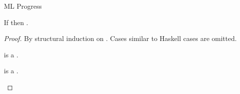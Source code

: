 \begin{theorem}{ML Progress}

\label{thmpsm}

If \judem{}{\varexpm}{\vartym} then \pshyp{\first{\varexpm}}{\second{\varexpm}}.

\begin{proof}

By structural induction on \varexpm.  Cases similar to Haskell cases are omitted.


\newcommand{\psconswm}{\expcons{\first{\varvalum}}{\second{\varvalum}}\xspace}

\begin{case}{\psconswm}

\psconswm is a \profv.

\end{case}


\newcommand{\psfappm}{\expfapp{\first{\varexpm}}{\second{\varexpm}}}
\renewcommand{\x}{\expfabss{\varvarm}{\first{\vartym}}{\third{\varexpm}}}

\begin{case}{\psfappm}

\pshypby
{\first{\varexpm}}
{\third{\varexpm}}
\psvalifeqm
{\first{\varexpm}}
{\tyfun{\first{\vartym}}{\second{\vartym}}}
{\x}
\pssub
{\first{\varexpm}}
{\third{\varexpm}}
{\psfappm}
{\expfapp{\third{\varexpm}}{\second{\varexpm}}}
\pserr
{\first{\varexpm}}
{\psfappm}
\pshypby
{\second{\varexpm}}
{\third{\varexpm}}
\pssuband
{\second{\varexpm}}
{\third{\varexpm}}
{\first{\varexpm}}
{\psfappm}
{\expfapp{\first{\varexpm}}{\third{\varexpm}}}
\pserrand
{\second{\varexpm}}
{\first{\varexpm}}
{\psfappm}
\psred
{\expfapp{(\x)}{\second{\varexpm}}}
{\expsubst{\third{\varexpm}}{\second{\varexpm}}{\varvarm}}

\end{case}


\newcommand{\psconsem}{\expcons{\first{\varexpm}}{\second{\varexpm}}\xspace}

\begin{case}{\psconsem}

\pshypby
{\first{\varexpm}}
{\third{\varexpm}}
\pssub
{\first{\varexpm}}
{\third{\varexpm}}
{\psconsem}
{\expcons{\third{\varexpm}}{\second{\varexpm}}}
\pserr
{\first{\varexpm}}
{\psconsem}
\pssuband
{\second{\varexpm}}
{\third{\varexpm}}
{\first{\varexpm}}
{\psconsem}
{\expcons{\third{\varexpm}}{\second{\varexpm}}}
\pserrand
{\second{\varexpm}}
{\first{\varexpm}}
{\psconsem}
\psvaliftwo
{\first{\varexpm}}
{\second{\varexpm}}
{\psconsem is a \profv.}

\end{case}

\end{proof}

\end{theorem}
